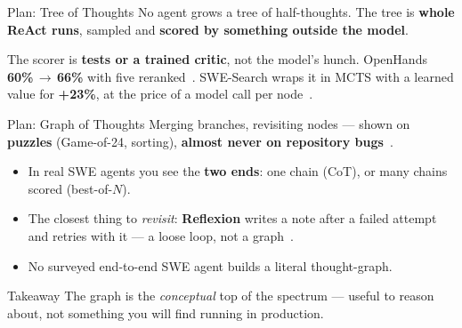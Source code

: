 \documentclass[
  aspectratio=169,
  font=times,
  sectionpage=true,
]{tumbeamer}
\begin{document}
\begin{frame}{Plan: Tree of Thoughts}
  \label{fr:bu-tot}
  {\small No agent grows a tree of half-thoughts. The tree is \textbf{whole ReAct
  runs}, sampled and \textbf{scored by something outside the model}.}

  \medskip
  \begin{center}
  \end{center}

  \medskip
  {\small The scorer is \textbf{tests or a trained critic}, not the model's
  hunch. OpenHands \textbf{60\%\,$\rightarrow$\,66\%} with five
  reranked~\cite{openhands2025verified}. SWE-Search wraps it in MCTS with a
  learned value for \textbf{+23\%}, at the price of a model call per
  node~\cite{antoniades2024swesearch}.}
\end{frame}

\begin{frame}{Plan: Graph of Thoughts}
  \label{fr:bu-got}
  {\small Merging branches, revisiting nodes --- shown on \textbf{puzzles}
  (Game-of-24, sorting), \textbf{almost never on repository
  bugs}~\cite{besta2024graph}.}

  \medskip
  \begin{itemize}
    \item In real SWE agents you see the \textbf{two ends}: one chain (CoT), or
      many chains scored (best-of-$N$).
      \medskip
    \item The closest thing to \emph{revisit}: \textbf{Reflexion} writes a note
      after a failed attempt and retries with it --- a loose loop, not a
      graph~\cite{shinn2023reflexion}.
      \medskip
    \item No surveyed end-to-end SWE agent builds a literal thought-graph.
  \end{itemize}

  \medskip
  \begin{block}{Takeaway}
    The graph is the \emph{conceptual} top of the spectrum --- useful to reason
    about, not something you will find running in production.
  \end{block}
\end{frame}
\end{document}
